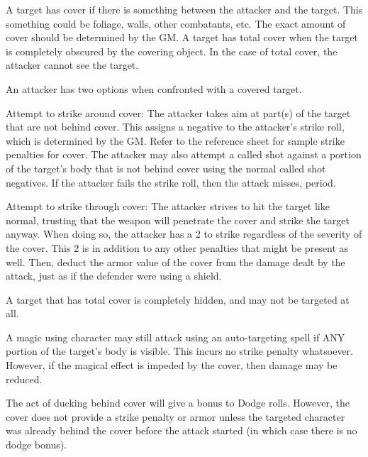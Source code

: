\documentclass[twoside]{book}
\begin{document}
    {  
     A target has cover if there is something between
               the attacker and the target. This something could be
               foliage, walls, other combatants, etc. The exact amount of
               cover should be determined by the GM. A target has total
               cover when the target is completely obscured by the
               covering object. In the case of total cover, the attacker
               cannot see the target. 
    }
  
    {  
     An attacker has two options when confronted with a
               covered target. 
    }
  
    {  
     Attempt to strike around cover: The attacker takes
               aim at part(s) of the target that are not behind cover.
               This assigns a negative to the attacker's strike
               roll, which is determined by the GM. Refer to the
               reference sheet for sample strike penalties for cover. The
               attacker may also attempt a called shot against a portion
               of the target's body that is not behind cover using
               the normal called shot negatives. If the attacker fails
               the strike roll, then the attack misses, period. 
    }
  
    {  
     Attempt to strike through cover: The attacker
               strives to hit the target like normal, trusting that the
               weapon will penetrate the cover and strike the target
               anyway. When doing so, the attacker has a 2 to
               strike regardless of the severity of the cover. This
               2 is in addition to any other penalties that might
               be present as well. Then, deduct the armor value of the
               cover from the damage dealt by the attack, just as if the
               defender were using a shield. 
    }
  
    {  
     A target that has total cover is completely hidden,
               and may not be targeted at all. 
    }
  
    {  
     A magic using character may still attack using an
               auto-targeting spell if ANY portion of the target's
               body is visible. This incurs no strike penalty whatsoever.
               However, if the magical effect is impeded by the cover,
               then damage may be reduced. 
    }
  
    {  
     The act of ducking behind cover will give a bonus
               to Dodge rolls. However, the cover does not provide a
               strike penalty or armor unless the targeted character was
               already behind the cover before the attack started (in
               which case there is no dodge bonus). 
    }
  
\end{document}
